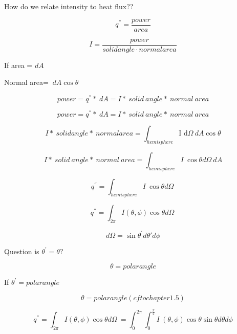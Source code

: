 \documentclass[12pt]{article}
\renewcommand{\_}{\kern-1.5pt\textunderscore\kern-1.5pt}
\begin{document}
How do we relate intensity to heat flux??\par

 \[ q^{''}=\frac{power}{area} \] \par

 \[ I=\frac{power}{solid angle \cdot normal area } \] \par

If area = \( dA \) \par

Normal area= \( ~dA\cos  \theta  \) \par

\par

 \[ power=q^{''}\ast~dA=I\ast~solid~angle\ast~normal~area  \] \par

 \[ power=q^{''}\ast~dA=I\ast~solid~angle\ast~normal~area  \] \par

 \[ I\ast~solid angle\ast~normal area= \int _{hemisphere}^{}\text{I d} \Omega ~dA\cos  \theta  \] \par

 \[ I\ast~solid~angle\ast~normal~area= \int _{hemisphere}^{}I~\cos  \theta d \Omega ~dA \] \par

 \[ q^{''}= \int _{hemisphere}^{}I~\cos  \theta d \Omega ~ \] \par

 \[ q^{''}= \int _{2 \pi }^{}I  \left(  \theta , \phi  \right)  \cos  \theta d \Omega ~ \] \par

 \[ d \Omega =\sin  \theta ^{'} d \theta ' d \phi  \] \par

Question is  \(  \theta ^{'}= \theta ? \) \par

 \[  \theta =polar angle \] \par

If  \(  \theta ^{'}=polar angle \) \par

 \[  \theta =polar angle  \left( cf to chapter 1.5 \right)  \] \par

 \[ q^{''}= \int _{2 \pi }^{}I  \left(  \theta , \phi  \right)  \cos  \theta d \Omega ~= \int _{0}^{2 \pi } \int _{0}^{\frac{ \pi }{2}}I~ \left(  \theta , \phi  \right) \cos  \theta \sin  \theta  d \theta d \phi  \] \par
\end{document}
